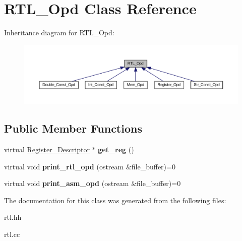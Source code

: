 \hypertarget{classRTL__Opd}{}\section{R\+T\+L\+\_\+\+Opd Class Reference}
\label{classRTL__Opd}


Inheritance diagram for R\+T\+L\+\_\+\+Opd\+:
\nopagebreak
\begin{figure}[H]
\begin{center}
\leavevmode
\includegraphics[width=350pt]{classRTL__Opd__inherit__graph}
\end{center}
\end{figure}
\subsection*{Public Member Functions}
\begin{DoxyCompactItemize}
\item 
\mbox{\label{classRTL__Opd_ae4ddfbff5a11b4cbb967604121849f3f}} 
virtual \hyperlink{classRegister__Descriptor}{Register\+\_\+\+Descriptor} $\ast$ {\bfseries get\+\_\+reg} ()
\item 
\mbox{\label{classRTL__Opd_a36a6b12df3a67fb04393b39e61985cc1}} 
virtual void {\bfseries print\+\_\+rtl\+\_\+opd} (ostream \&file\+\_\+buffer)=0
\item 
\mbox{\label{classRTL__Opd_a3692407a7a449d258768b3faf6f63e47}} 
virtual void {\bfseries print\+\_\+asm\+\_\+opd} (ostream \&file\+\_\+buffer)=0
\end{DoxyCompactItemize}


The documentation for this class was generated from the following files\+:\begin{DoxyCompactItemize}
\item 
rtl.\+hh\item 
rtl.\+cc\end{DoxyCompactItemize}
